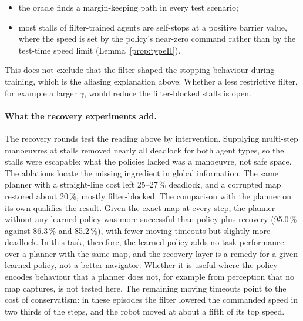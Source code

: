 \documentclass[11pt]{article}
\theoremstyle{definition}
\theoremstyle{remark}
\begin{document}
\begin{itemize}
  \item the oracle finds a margin-keeping path in every test scenario;
  \item most stalls of filter-trained agents are self-stops at a positive barrier value, where the speed is set by the policy's near-zero command rather than by the test-time speed limit (Lemma~\ref{prop:typeII}).
\end{itemize}
This does not exclude that the filter shaped the stopping behaviour during training, which is the aliasing explanation above. Whether a less restrictive filter, for example a larger $\gamma$, would reduce the filter-blocked stalls is open.

\paragraph{What the recovery experiments add.} The recovery rounds test the reading above by intervention. Supplying multi-step manoeuvres at stalls removed nearly all deadlock for both agent types, so the stalls were escapable: what the policies lacked was a manoeuvre, not safe space. The ablations locate the missing ingredient in global information. The same planner with a straight-line cost left 25--27\,\% deadlock, and a corrupted map restored about 20\,\%, mostly filter-blocked. The comparison with the planner on its own qualifies the result. Given the exact map at every step, the planner without any learned policy was more successful than policy plus recovery (95.0\,\% against 86.3\,\% and 85.2\,\%), with fewer moving timeouts but slightly more deadlock. In this task, therefore, the learned policy adds no task performance over a planner with the same map, and the recovery layer is a remedy for a given learned policy, not a better navigator. Whether it is useful where the policy encodes behaviour that a planner does not, for example from perception that no map captures, is not tested here. The remaining moving timeouts point to the cost of conservatism: in these episodes the filter lowered the commanded speed in two thirds of the steps, and the robot moved at about a fifth of its top speed.
\end{document}
